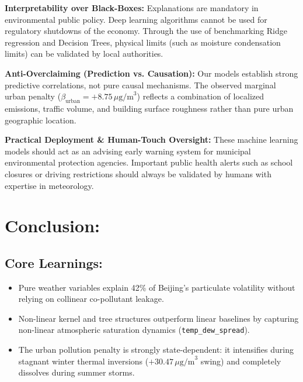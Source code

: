 \documentclass[a4paper,12pt,twocolumn]{article}
\begin{document}
\vspace{1mm}
\noindent
\textbf{Interpretability over Black-Boxes:} 
Explanations are mandatory in environmental public policy. Deep learning algorithms cannot be used for regulatory shutdowns of the economy. Through the use of benchmarking Ridge regression and Decision Trees, physical limits (such as moisture condensation limits) can be validated by local authorities.

\vspace{1mm}
\noindent
\textbf{Anti-Overclaiming (Prediction vs. Causation):} 
Our models establish strong predictive correlations, not pure causal mechanisms. The observed marginal urban penalty ($\beta_{\text{urban}} = +8.75\,\mu\text{g/m}^3$) reflects a combination of localized emissions, traffic volume, and building surface roughness rather than pure urban geographic location.

\vspace{1mm}
\noindent
\textbf{Practical Deployment \& Human-Touch Oversight:} 
These machine learning models should act as an advising early warning system for municipal environmental protection agencies. Important public health alerts such as school closures or driving restrictions should always be validated by humans with expertise in meteorology.

\section{Conclusion:}
\label{sec:conclusion}

\subsection{Core Learnings:}
\begin{itemize}
    \item Pure weather variables explain 42\% of Beijing's particulate volatility without relying on collinear co-pollutant leakage.
    \item Non-linear kernel and tree structures outperform linear baselines by capturing non-linear atmospheric saturation dynamics (\texttt{temp\_dew\_spread}).
    \item The urban pollution penalty is strongly state-dependent: it intensifies during stagnant winter thermal inversions ($+30.47\,\mu\text{g/m}^3$ swing) and completely dissolves during summer storms.
\end{itemize}
\end{document}
